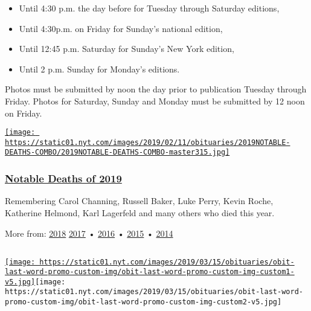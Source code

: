 \begin{itemize}
\tightlist
\item
  Until 4:30 p.m. the day before for Tuesday through Saturday editions,
\item
  Until 4:30p.m. on Friday for Sunday's national edition,
\item
  Until 12:45 p.m. Saturday for Sunday's New York edition,
\item
  Until 2 p.m. Sunday for Monday's editions.
\end{itemize}

Photos must be submitted by noon the day prior to publication Tuesday
through Friday. Photos for Saturday, Sunday and Monday must be submitted
by 12 noon on Friday.

\href{https://www.nytimes.com/interactive/2019/obituaries/notable-deaths.html}{\texttt{[image: https://static01.nyt.com/images/2019/02/11/obituaries/2019NOTABLE-DEATHS-COMBO/2019NOTABLE-DEATHS-COMBO-master315.jpg]}}

\hypertarget{notable-deaths-of-2019}{%
\subsubsection{\texorpdfstring{\href{https://www.nytimes.com/interactive/2019/obituaries/notable-deaths.html}{Notable
Deaths of 2019}}{Notable Deaths of 2019}}\label{notable-deaths-of-2019}}

Remembering Carol Channing, Russell Baker, Luke Perry, Kevin Roche,
Katherine Helmond, Karl Lagerfeld and many others who died this year.

More from:
\href{https://www.nytimes.com/interactive/2018/obituaries/notable-deaths.html}{2018}
\href{https://www.nytimes.com/interactive/projects/notable-deaths/2017}{2017}
•
\href{https://www.nytimes.com/interactive/projects/notable-deaths/2016}{2016}
•
\href{https://www.nytimes.com/interactive/2015/obituaries/notable-deaths-2015.html}{2015}
•
\href{https://www.nytimes.com/interactive/2014/obituaries/notable-deaths-2014.html}{2014}

\subsection{}

\href{https://www.nytimes.com/video/last-word}{\texttt{[image: https://static01.nyt.com/images/2019/03/15/obituaries/obit-last-word-promo-custom-img/obit-last-word-promo-custom-img-custom1-v5.jpg]}}\texttt{[image: https://static01.nyt.com/images/2019/03/15/obituaries/obit-last-word-promo-custom-img/obit-last-word-promo-custom-img-custom2-v5.jpg]}

